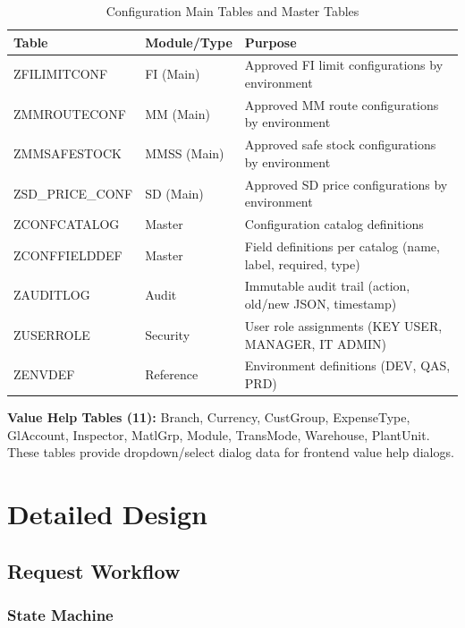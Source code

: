 \documentclass[12pt,a4paper]{report}
\begin{document}
\begin{table}[H]
\centering\small
\begin{tabularx}{\textwidth}{|l|l|X|}
  \hline
  \rowcolor{tableheadpeach}
  \textbf{Table} & \textbf{Module/Type} & \textbf{Purpose} \\ \hline
  ZFILIMITCONF   & FI (Main)     & Approved FI limit configurations by environment \\ \hline
  ZMMROUTECONF   & MM (Main)     & Approved MM route configurations by environment \\ \hline
  ZMMSAFESTOCK   & MMSS (Main)   & Approved safe stock configurations by environment \\ \hline
  ZSD\_PRICE\_CONF & SD (Main)   & Approved SD price configurations by environment \\ \hline
  ZCONFCATALOG   & Master        & Configuration catalog definitions \\ \hline
  ZCONFFIELDDEF  & Master        & Field definitions per catalog (name, label, required, type) \\ \hline
  ZAUDITLOG      & Audit         & Immutable audit trail (action, old/new JSON, timestamp) \\ \hline
  ZUSERROLE      & Security      & User role assignments (KEY USER, MANAGER, IT ADMIN) \\ \hline
  ZENVDEF        & Reference     & Environment definitions (DEV, QAS, PRD) \\ \hline
\end{tabularx}
\caption{Configuration Main Tables and Master Tables}
\label{tab:main-master-tables}
\end{table}

\noindent\textbf{Value Help Tables (11):} Branch, Currency, CustGroup, ExpenseType, GlAccount, Inspector, MatlGrp, Module, TransMode, Warehouse, PlantUnit. These tables provide dropdown/select dialog data for frontend value help dialogs.


\section{Detailed Design}

\subsection{Request Workflow}

\subsubsection{State Machine}
\end{document}
